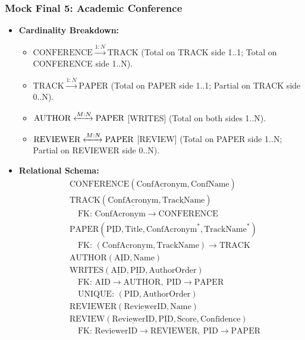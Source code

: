 \documentclass[10pt,a4paper]{article}
\begin{document}
\subsubsection*{Mock Final 5: Academic Conference}
\begin{itemize}
  \item \textbf{Cardinality Breakdown:}
  \begin{itemize}
    \item $\mathrm{CONFERENCE} \xrightarrow{1:N} \mathrm{TRACK}$ (Total on TRACK side 1..1; Total on CONFERENCE side 1..N).
    \item $\mathrm{TRACK} \xrightarrow{1:N} \mathrm{PAPER}$ (Total on PAPER side 1..1; Partial on TRACK side 0..N).
    \item $\mathrm{AUTHOR} \xleftrightarrow{M:N} \mathrm{PAPER}$ [WRITES] (Total on both sides 1..N).
    \item $\text{REVIEWER} \xleftrightarrow{M:N} \text{PAPER}$ [REVIEW] (Total on PAPER side 1..N; Partial on REVIEWER side 0..N).
  \end{itemize}
  \item \textbf{Relational Schema:}
  \begin{align*}
    &\mathrm{CONFERENCE}(\underline{\mathrm{ConfAcronym}}, \mathrm{ConfName})\\
    &\mathrm{TRACK}(\underline{\mathrm{ConfAcronym}}, \underline{\mathrm{TrackName}})\\
    &\quad \text{FK: } \mathrm{ConfAcronym} \to \mathrm{CONFERENCE}\\
    &\mathrm{PAPER}(\underline{\mathrm{PID}}, \mathrm{Title}, \mathrm{ConfAcronym}^*, \mathrm{TrackName}^*)\\
    &\quad \text{FK: } (\mathrm{ConfAcronym}, \mathrm{TrackName}) \to \mathrm{TRACK}\\
    &\mathrm{AUTHOR}(\underline{\mathrm{AID}}, \mathrm{Name})\\
    &\mathrm{WRITES}(\underline{\mathrm{AID}}, \underline{\mathrm{PID}}, \mathrm{AuthorOrder})\\
    &\quad \text{FK: } \mathrm{AID} \to \mathrm{AUTHOR},\ \mathrm{PID} \to \mathrm{PAPER}\\
    &\quad \text{UNIQUE: } (\mathrm{PID}, \mathrm{AuthorOrder})\\
    &\mathrm{REVIEWER}(\underline{\mathrm{ReviewerID}}, \mathrm{Name})\\
    &\mathrm{REVIEW}(\underline{\mathrm{ReviewerID}}, \underline{\mathrm{PID}}, \mathrm{Score}, \mathrm{Confidence})\\
    &\quad \text{FK: } \mathrm{ReviewerID} \to \mathrm{REVIEWER},\ \mathrm{PID} \to \mathrm{PAPER}
  \end{align*}
\end{itemize}
\end{document}
